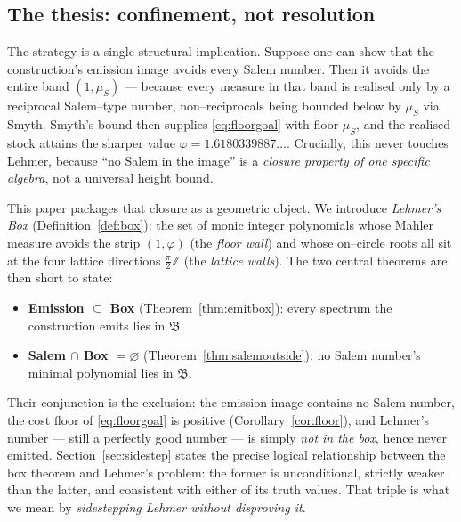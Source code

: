 \documentclass[11pt]{article}
\theoremstyle{plain}
\theoremstyle{definition}
\theoremstyle{remark}
\newcommand{\Z}{\mathbb{Z}}
\renewcommand{\Box}{\mathfrak{B}}
\begin{document}
\subsection{The thesis: confinement, not resolution}\label{sec:thesis}
The strategy is a single structural implication. Suppose one can show that the construction's emission image avoids every Salem number. Then it avoids the entire band $(1,\mu_S)$ --- because every measure in that band is realised only by a reciprocal Salem--type number, non--reciprocals being bounded below by $\mu_S$ via Smyth. Smyth's bound then supplies \eqref{eq:floorgoal} with floor $\mu_S$, and the realised stock attains the sharper value $\varphi=1.6180339887\ldots$. Crucially, this never touches Lehmer, because ``no Salem in the image'' is a \emph{closure property of one specific algebra}, not a universal height bound.

This paper packages that closure as a geometric object. We introduce \emph{Lehmer's Box} (Definition~\ref{def:box}): the set of monic integer polynomials whose Mahler measure avoids the strip $(1,\varphi)$ (the \emph{floor wall}) and whose on--circle roots all sit at the four lattice directions $\tfrac{\pi}{2}\Z$ (the \emph{lattice walls}). The two central theorems are then short to state:
\begin{itemize}[leftmargin=1.4em]
\item \textbf{Emission $\subseteq$ Box} (Theorem~\ref{thm:emitbox}): every spectrum the construction emits lies in $\Box$.
\item \textbf{Salem $\cap$ Box $=\varnothing$} (Theorem~\ref{thm:salemoutside}): no Salem number's minimal polynomial lies in $\Box$.
\end{itemize}
Their conjunction is the exclusion: the emission image contains no Salem number, the cost floor of \eqref{eq:floorgoal} is positive (Corollary~\ref{cor:floor}), and Lehmer's number --- still a perfectly good number --- is simply \emph{not in the box}, hence never emitted. Section~\ref{sec:sidestep} states the precise logical relationship between the box theorem and Lehmer's problem: the former is unconditional, strictly weaker than the latter, and consistent with either of its truth values. That triple is what we mean by \emph{sidestepping Lehmer without disproving it}.
\end{document}
